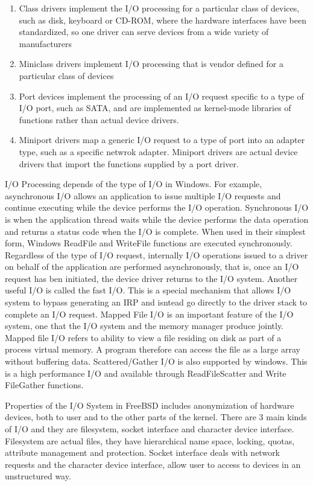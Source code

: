 \documentclass[letterpaper,10pt,draftclsnofoot,onecolumn]{IEEEtran}
\begin{document}
\begin{enumerate}
\item Class drivers implement the I/O processing for a particular class of devices, such as disk, keyboard or CD-ROM, where the hardware interfaces have been standardized, so one driver can serve devices from a wide variety of manufacturers
\item Miniclass drivers implement I/O processing that is vendor defined for a particular class of devices
\item Port devices implement the processing of an I/O request specific to a type of I/O port, such as SATA, and are implemented as kernel-mode libraries of functions rather than actual device drivers.
\item Miniport drivers map a generic I/O request to a type of port into an adapter type, such as a specific netwrok adapter. Miniport drivers are actual device drivers that import the functions supplied by a port driver.
\end{enumerate}
I/O Processing depends of the type of I/O in Windows. For example, asynchronous I/O allows an application to issue multiple I/O requests and continue executing while the device performs the I/O operation. Synchronous I/O is when the application thread waits while the device performs the data operation and returns a status code when the I/O is complete. When used in their simplest form, Windows ReadFile and WriteFile functions are executed synchronously. Regardless of the type of I/O request, internally I/O operations issued to a driver on behalf of the application are performed asynchronously, that is, once an I/O request has ben initiated, the device driver returns to the I/O system.
Another useful I/O is called the fast I/O. This is a special mechanism that allows I/O system to bypass generating an IRP and isntead go directly to the driver stack to complete an I/O request. Mapped File I/O is an important feature of the I/O system, one that the I/O system and the memory manager produce jointly. Mapped file I/O refers to ability to view a file residing on disk as part of a process virtual memory. A program therefore can access the file as a large array without buffering data. Scattered/Gather I/O is also supported by windows. This is a high performance I/O and available through ReadFileScatter and Write FileGather functions.


Properties of the I/O System in FreeBSD includes anonymization of hardware devices, both to user and to the other parts of the kernel. 
There are 3 main kinds of I/O and they are filesystem, socket interface and character device interface. Filesystem are actual files, they have hierarchical name space, locking, quotas, attribute management and protection. Socket interface deals with network requests and the character device interface, allow user to access to devices in an unstructured way.
\end{document}
